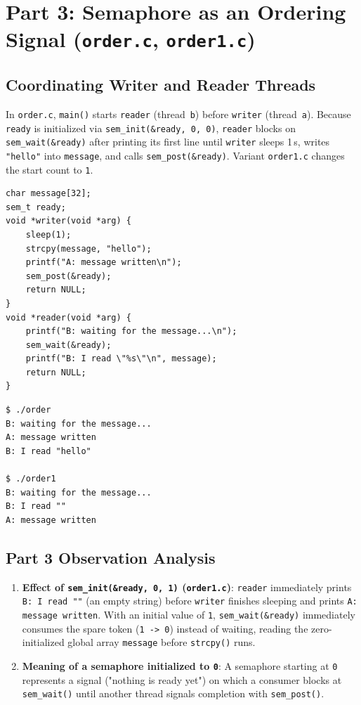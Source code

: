 \documentclass[12pt,a4paper]{article}
\begin{document}
\section{Part 3: Semaphore as an Ordering Signal (\texttt{order.c}, \texttt{order1.c})}

\subsection{Coordinating Writer and Reader Threads}
In \texttt{order.c}, \texttt{main()} starts \texttt{reader} (thread~\texttt{b}) before \texttt{writer} (thread~\texttt{a}). Because \texttt{ready} is initialized via \texttt{sem\_init(\&ready, 0, 0)}, \texttt{reader} blocks on \texttt{sem\_wait(\&ready)} after printing its first line until \texttt{writer} sleeps 1\,s, writes \texttt{"hello"} into \texttt{message}, and calls \texttt{sem\_post(\&ready)}. Variant \texttt{order1.c} changes the start count to \texttt{1}.

\begin{lstlisting}[style=cstyle,caption={Writer-before-reader coordination in \texttt{order.c}}]
char message[32];
sem_t ready;
void *writer(void *arg) {
    sleep(1);
    strcpy(message, "hello");
    printf("A: message written\n");
    sem_post(&ready);
    return NULL;
}
void *reader(void *arg) {
    printf("B: waiting for the message...\n");
    sem_wait(&ready);
    printf("B: I read \"%s\"\n", message);
    return NULL;
}
\end{lstlisting}

\begin{lstlisting}[style=consolestyle]
$ ./order
B: waiting for the message...
A: message written
B: I read "hello"

$ ./order1
B: waiting for the message...
B: I read ""
A: message written
\end{lstlisting}

\subsection{Part 3 Observation Analysis}
\begin{enumerate}
    \item \textbf{Effect of \texttt{sem\_init(\&ready, 0, 1)} (\texttt{order1.c})}: \texttt{reader} immediately prints \texttt{B: I read ""} (an empty string) before \texttt{writer} finishes sleeping and prints \texttt{A: message written}. With an initial value of \texttt{1}, \texttt{sem\_wait(\&ready)} immediately consumes the spare token (\texttt{1 -> 0}) instead of waiting, reading the zero-initialized global array \texttt{message} before \texttt{strcpy()} runs.
    \item \textbf{Meaning of a semaphore initialized to \texttt{0}}: A semaphore starting at \texttt{0} represents a signal ("nothing is ready yet") on which a consumer blocks at \texttt{sem\_wait()} until another thread signals completion with \texttt{sem\_post()}.
\end{enumerate}
\end{document}

